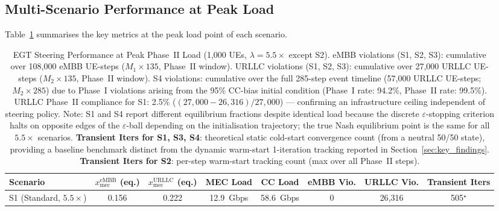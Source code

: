 \documentclass[conference]{IEEEtran}
\begin{document}
\subsection{Multi-Scenario Performance at Peak Load}

Table~\ref{tab:stadium_results} summarises the key metrics
at the peak load point of each scenario.

\begin{table}[t]
\centering
\caption{EGT Steering Performance at Peak Phase~II Load (1,000 UEs,
         $\lambda=5.5\times$ except S2).
         eMBB violations (S1, S2, S3): cumulative over 108,000 eMBB UE-steps
         ($M_1 \times 135$, Phase~II window).
         URLLC violations (S1, S2, S3): cumulative over 27,000 URLLC UE-steps
         ($M_2 \times 135$, Phase~II window).
         S4 violations: cumulative over the full 285-step event timeline
         (57,000 URLLC UE-steps; $M_2 \times 285$) due to Phase~I
         violations arising from the 95\% CC-bias initial condition
         (Phase~I rate: 94.2\%, Phase~II rate: 99.5\%).
         URLLC Phase~II compliance for S1: 2.5\%
         ($(27{,}000 - 26{,}316)/27{,}000$) --- confirming
         an infrastructure ceiling independent of steering policy.
         Note: S1 and S4 report different equilibrium fractions
         despite identical load because the discrete $\varepsilon$-stopping
         criterion halts on opposite edges of the $\varepsilon$-ball depending
         on the initialisation trajectory; the true Nash equilibrium point
         is the same for all $5.5\times$ scenarios.
         \textbf{Transient Iters for S1, S3, S4}: theoretical static cold-start
         convergence count (from a neutral 50/50 state), providing a baseline
         benchmark distinct from the dynamic warm-start 1-iteration tracking
         reported in Section~\ref{sec:key_findings}.
         \textbf{Transient Iters for S2}: per-step warm-start tracking count
         (max over all Phase~II steps).}
\label{tab:stadium_results}
\renewcommand{\arraystretch}{1.15}
\begin{tabular}{lccccccc}
\toprule
\textbf{Scenario} &
  \textbf{$x_\text{mec}^\text{eMBB}$ (eq.)} &
  \textbf{$x_\text{mec}^\text{URLLC}$ (eq.)} &
  \textbf{MEC Load} &
  \textbf{CC Load} &
  \textbf{eMBB Vio.} &
  \textbf{URLLC Vio.} &
  \textbf{Transient Iters} \\
\midrule
S1 (Standard, $5.5\times$)
  & 0.156 & 0.222 & 12.9~Gbps & 58.6~Gbps & 0 & 26{,}316 & 505$^\star$ \\

\end{tabular}
\end{table}
\end{document}
